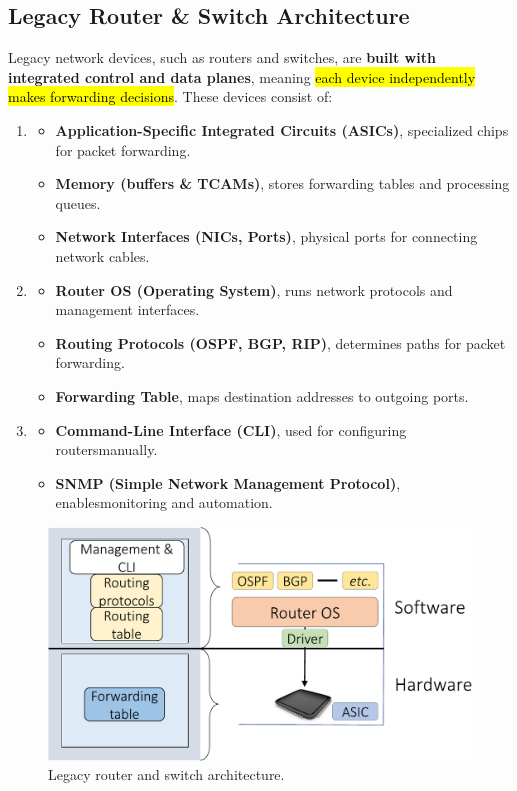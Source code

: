 \subsection{Legacy Router \& Switch Architecture}

Legacy network devices, such as routers and switches, are \textbf{built with integrated control and data planes}, meaning \hl{each device independently makes forwarding decisions}. These devices consist of:
\begin{enumerate}
    \item {}
    \begin{itemize}
        \item \textbf{Application-Specific Integrated Circuits (ASICs)}, specialized chips for packet forwarding.
        \item \textbf{Memory (buffers \& TCAMs)}, stores forwarding tables and processing queues.
        \item \textbf{Network Interfaces (NICs, Ports)}, physical ports for connecting network cables.
    \end{itemize}
    \item {}
    \begin{itemize}
        \item \textbf{Router OS (Operating System)}, runs network protocols and management interfaces.
        \item \textbf{Routing Protocols (OSPF, BGP, RIP)}, determines paths for packet forwarding.
        \item \textbf{Forwarding Table}, maps destination addresses to outgoing ports.
    \end{itemize}
    \item {}
    \begin{itemize}
        \item \textbf{Command-Line Interface (CLI)}, used for configuring routers\break manually.
        \item \textbf{SNMP (Simple Network Management Protocol)}, enables\break monitoring and automation.
    \end{itemize}
\end{enumerate}

\begin{figure}[!htp]
    \centering
    \includegraphics[width=.7\textwidth]{img/router-switch-arc.pdf}
    \caption{Legacy router and switch architecture.}
\end{figure}

